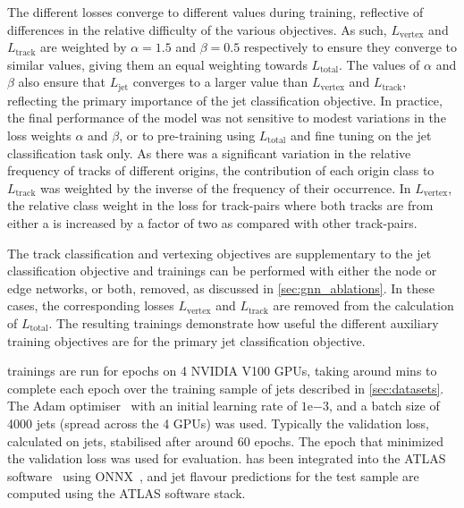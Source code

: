 The different losses converge to different values during training, reflective of differences in the relative difficulty of the various objectives.
As such, $L_\text{vertex}$ and $L_\text{track}$ are weighted by $\alpha = 1.5$ and $\beta = 0.5$ respectively to ensure they converge to similar values, giving them an equal weighting towards $L_\text{total}$. 
The values of $\alpha$ and $\beta$ also ensure that $L_\text{jet}$ converges to a larger value than $L_\text{vertex}$ and $L_\text{track}$, reflecting the primary importance of the jet classification objective.
In practice, the final performance of the model was not sensitive to modest variations in the loss weights $\alpha$ and $\beta$, or to pre-training using $L_\text{total}$ and fine tuning on the jet classification task only.
As there was a significant variation in the relative frequency of tracks of different origins, the contribution of each origin class to $L_\text{track}$ was weighted by the inverse of the frequency of their occurrence.
In $L_\text{vertex}$, the relative class weight in the loss for track-pairs where both tracks are from either a \borchadron is increased by a factor of two as compared with other track-pairs.

The track classification and vertexing objectives are supplementary to the jet classification objective and trainings can be performed with either the node or edge networks, or both, removed, as discussed in \cref{sec:gnn_ablations}.
In these cases, the corresponding losses $L_\text{vertex}$ and $L_\text{track}$ are removed from the calculation of $L_\text{total}$. 
The resulting trainings demonstrate how useful the different auxiliary training objectives are for the primary jet classification objective.

\GNN trainings are run for \nepochs epochs on 4 NVIDIA V100 GPUs, taking around \minsperepoch mins to complete each epoch over the training sample of \njetstrain jets described in \cref{sec:datasets}.
The Adam optimiser~\cite{arxiv.1412.6980} with an initial learning rate of $1\mathrm{e}{-3}$, and a batch size of 4000 jets (spread across the 4 GPUs) was used.
Typically the validation loss, calculated on \njetsval jets, stabilised after around 60 epochs.
The epoch that minimized the validation loss was used for evaluation.
\GNN has been integrated into the ATLAS software~\cite{ATL-SOFT-PUB-2021-001} using ONNX~\cite{bai2019}, and jet flavour predictions for the test sample are computed using the ATLAS software stack.


